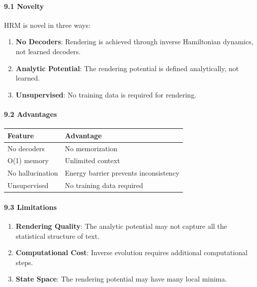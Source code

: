 \documentclass[
  11pt,
  a4paper,
]{article}
\providecommand{\tightlist}{%
  \setlength{\itemsep}{0pt}\setlength{\parskip}{0pt}}
\begin{document}
\paragraph{9.1 Novelty}\label{novelty-1}

HRM is novel in three ways:

\begin{enumerate}
\def\labelenumi{\arabic{enumi}.}
\tightlist
\item
  \textbf{No Decoders}: Rendering is achieved through inverse
  Hamiltonian dynamics, not learned decoders.
\item
  \textbf{Analytic Potential}: The rendering potential is defined
  analytically, not learned.
\item
  \textbf{Unsupervised}: No training data is required for rendering.
\end{enumerate}

\paragraph{9.2 Advantages}\label{advantages-1}

\begin{longtable}[]{@{}ll@{}}
\toprule\noalign{}
Feature & Advantage \\
\midrule\noalign{}
\endhead
\bottomrule\noalign{}
\endlastfoot
No decoders & No memorization \\
O(1) memory & Unlimited context \\
No hallucination & Energy barrier prevents inconsistency \\
Unsupervised & No training data required \\
\end{longtable}

\paragraph{9.3 Limitations}\label{limitations-4}

\begin{enumerate}
\def\labelenumi{\arabic{enumi}.}
\tightlist
\item
  \textbf{Rendering Quality}: The analytic potential may not capture all
  the statistical structure of text.
\item
  \textbf{Computational Cost}: Inverse evolution requires additional
  computational steps.
\item
  \textbf{State Space}: The rendering potential may have many local
  minima.
\end{enumerate}
\end{document}
